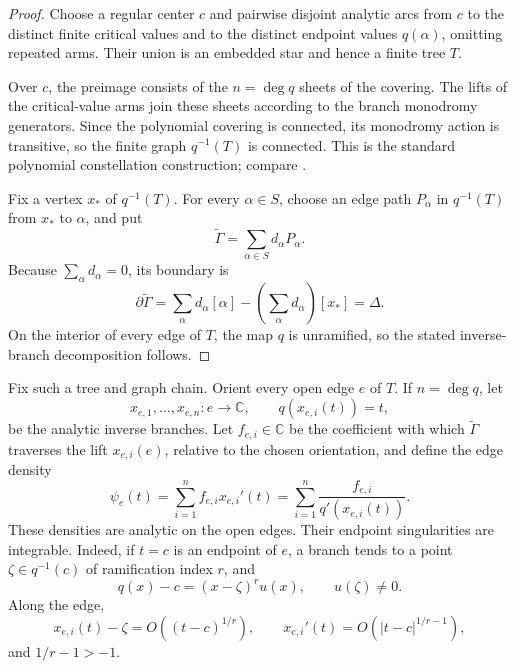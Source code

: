 \documentclass[11pt]{article}
\numberwithin{equation}{section}
\theoremstyle{definition}
\theoremstyle{remark}
\newcommand{\C}{\mathbb C}
\begin{document}
\begin{proof}
Choose a regular center $c$ and pairwise disjoint analytic arcs from $c$ to
the distinct finite critical values and to the distinct endpoint values
$q(\alpha)$, omitting repeated arms.  Their union is an embedded star and
hence a finite tree $T$.

Over $c$, the preimage consists of the $n=\deg q$ sheets of the covering.
The lifts of the critical-value arms join these sheets according to the branch
monodromy generators.  Since the polynomial covering is connected, its
monodromy action is transitive, so the finite graph $q^{-1}(T)$ is connected.
This is the standard polynomial constellation construction; compare
\cite[Section~2.1]{PakovichMuzychuk}.

Fix a vertex $x_*$ of $q^{-1}(T)$.  For every $\alpha\in S$, choose an edge
path $P_\alpha$ in $q^{-1}(T)$ from $x_*$ to $\alpha$, and put
\[
  \widetilde\Gamma=\sum_{\alpha\in S}d_\alpha P_\alpha.
\]
Because $\sum_\alpha d_\alpha=0$, its boundary is
\[
  \partial\widetilde\Gamma
  =\sum_\alpha d_\alpha[\alpha]
   -\left(\sum_\alpha d_\alpha\right)[x_*]
  =\Delta.
\]
On the interior of every edge of $T$, the map $q$ is unramified, so the stated
inverse-branch decomposition follows.
\end{proof}

Fix such a tree and graph chain.  Orient every open edge $e$ of $T$.  If
$n=\deg q$, let
\[
  x_{e,1},\ldots,x_{e,n}:e\longrightarrow\C,
  \qquad q(x_{e,i}(t))=t,
\]
be the analytic inverse branches.  Let $f_{e,i}\in\C$ be the coefficient with
which $\widetilde\Gamma$ traverses the lift $x_{e,i}(e)$, relative to the
chosen orientation, and define the edge density
\begin{equation}\label{eq:edge-density}
  \psi_e(t)
  =\sum_{i=1}^n f_{e,i}x_{e,i}'(t)
  =\sum_{i=1}^n\frac{f_{e,i}}{q'(x_{e,i}(t))}.
\end{equation}
These densities are analytic on the open edges.  Their endpoint singularities
are integrable.  Indeed, if $t=c$ is an endpoint of $e$, a branch tends to a
point $\zeta\in q^{-1}(c)$ of ramification index $r$, and
\[
  q(x)-c=(x-\zeta)^ru(x),
  \qquad u(\zeta)\ne0.
\]
Along the edge,
\[
  x_{e,i}(t)-\zeta=O((t-c)^{1/r}),
  \qquad
  x_{e,i}'(t)=O(|t-c|^{1/r-1}),
\]
and $1/r-1>-1$.
\end{document}
